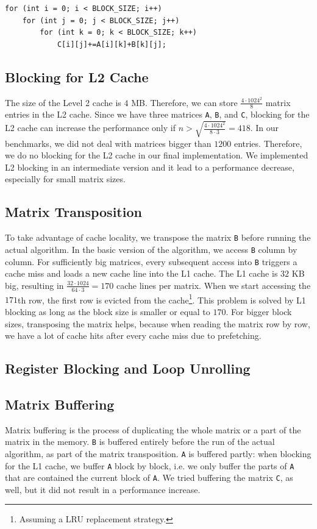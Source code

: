 \documentclass[12pt]{article}
\begin{document}
\begin{lstlisting}
for (int i = 0; i < BLOCK_SIZE; i++)
	for (int j = 0; j < BLOCK_SIZE; j++)
		for (int k = 0; k < BLOCK_SIZE; k++)
			C[i][j]+=A[i][k]+B[k][j];
\end{lstlisting}

\subsection{Blocking for L2 Cache}
The size of the Level 2 cache is $4$ MB. Therefore, we can store $\frac{4 \cdot 1024^2}{8}$ matrix entries in the L2 cache. Since we have three matrices \lstinline{A}, \lstinline{B}, and \lstinline{C}, blocking for the L2 cache can increase the performance only if $n > \sqrt{\frac{4 \cdot 1024^2}{8 \cdot 3}} = 418$. In our benchmarks, we did not deal with matrices bigger than $1200$ entries. Therefore, we do no blocking for the L2 cache in our final implementation. We implemented L2 blocking in an intermediate version and it lead to a performance decrease, especially for small matrix sizes.

\subsection{Matrix Transposition}
To take advantage of cache locality, we transpose the matrix \lstinline{B} before running the actual algorithm. In the basic version of the algorithm, we access \lstinline{B} column by column. For sufficiently big matrices, every subsequent access into \lstinline{B} triggers a cache miss and loads a new cache line into the L1 cache. The L1 cache is $32$ KB big, resulting in $\frac{32 \cdot 1024}{64 \cdot 3} = 170$ cache lines per matrix. When we start accessing the $171$th row, the first row is evicted from the cache\footnote{Assuming a LRU replacement strategy.}. This problem is solved by L1 blocking as long as the block size is smaller or equal to $170$. For bigger block sizes, transposing the matrix helps, because when reading the matrix row by row, we have a lot of cache hits after every cache miss due to prefetching. 

\subsection{Register Blocking and Loop Unrolling}

\subsection{Matrix Buffering}
Matrix buffering is the process of duplicating the whole matrix or a part of the matrix in the memory. \lstinline{B} is buffered entirely before the run of the actual algorithm, as part of the matrix transposition. \lstinline{A} is buffered partly: when blocking for the L1 cache, we buffer \lstinline{A} block by block, i.e. we only buffer the parts of \lstinline{A} that are contained the current block of \lstinline{A}. We tried buffering the matrix \lstinline{C}, as well, but it did not result in a performance increase. 
\end{document}
